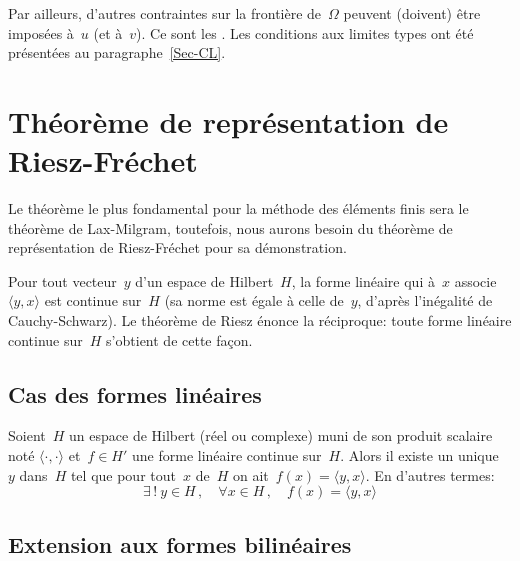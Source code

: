 \medskip
Par ailleurs, d'autres contraintes sur la frontière de~$\Omega$ peuvent (doivent) être imposées à~$u$ (et à~$v$). Ce sont les .
Les conditions aux limites types ont été présentées au paragraphe~\ref{Sec-CL}.

\medskip
\section{Théorème de représentation de Riesz-Fréchet}
Le théorème le plus fondamental pour la méthode des éléments finis sera le théorème de Lax-Milgram, toutefois, nous aurons besoin du théorème de représentation de Riesz-Fréchet pour sa démonstration. 

\medskip
Pour tout vecteur~$y$ d'un espace de Hilbert~$H$, la forme linéaire qui à~$x$ associe~$\langle y,x\rangle$ est continue sur~$H$ (sa norme est égale à celle de~$y$, d'après l'inégalité de Cauchy-Schwarz). Le théorème de Riesz énonce la réciproque: toute forme linéaire continue sur~$H$ s'obtient de cette façon.

\medskip
\subsection{Cas des formes linéaires}

\begin{theoreme}\label{Th-RF}
Soient~$H$ un espace de Hilbert (réel ou complexe) muni de son produit scalaire noté $\langle\cdot,\cdot\rangle$ et~$f \in H'$ une forme linéaire continue sur~$H$.
Alors il existe un unique~$y$ dans~$H$ tel que pour tout~$x$ de~$H$ on ait~$f(x)=\langle y,x\rangle$. En d'autres termes:
\begin{equation}\label{Eq-Th-RF}
\exists\,!\ y \in H\,, \quad \forall x\in H\,, \quad f(x) = \langle y,x\rangle
\end{equation}
\end{theoreme}

\medskip
\subsection{Extension aux formes bilinéaires}

